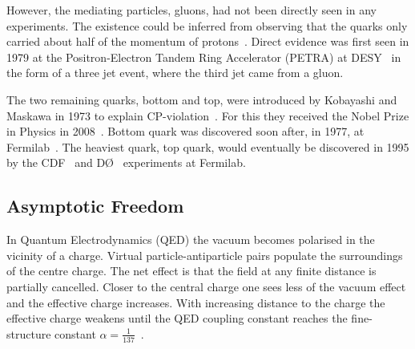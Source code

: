 However, the mediating particles, gluons, had not been directly seen in any experiments. The existence could be inferred from observing that the quarks only carried about half of the momentum of protons~\cite{25gluons}. Direct evidence was first seen in 1979 at the Positron-Electron Tandem Ring Accelerator (PETRA) at DESY~\cite{Brandelik:1979bd, PhysRev.43.830, Berger1979418} in the form of a three jet event, where the third jet came from a gluon.

The two remaining quarks, bottom and top, were introduced by Kobayashi and Maskawa in 1973 to explain CP-violation~\cite{Kobayashi:1973fv}. For this they received the Nobel Prize in Physics in 2008~\cite{Nobel2008}. Bottom quark was discovered soon after, in 1977, at Fermilab~\cite{Herb:1977ek}. The heaviest quark, top quark, would eventually be discovered in 1995 by the CDF~\cite{Abe:1995hr} and DØ~\cite{Abachi:1994td} experiments at Fermilab.




\subsection{Asymptotic Freedom}
In Quantum Electrodynamics (QED) the vacuum becomes polarised in the vicinity of a charge. Virtual particle-antiparticle pairs populate the surroundings of the centre charge.
The net effect is that the field at any finite distance is partially cancelled. Closer to the central charge one sees less of the vacuum effect and the effective charge increases. With increasing distance to the charge the effective charge weakens until the QED coupling constant reaches the fine-structure constant $\alpha=\frac{1}{137}$~\cite{Perkins:1982xb}.




